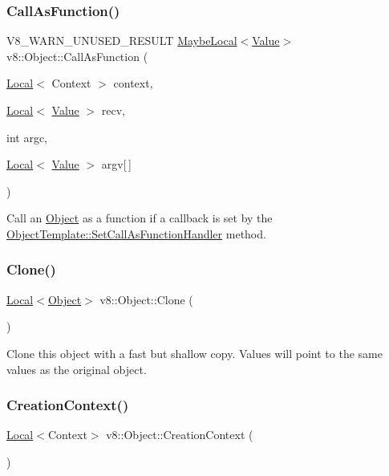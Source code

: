 \subsubsection{\texorpdfstring{Call\+As\+Function()}{CallAsFunction()}}
{\footnotesize\ttfamily V8\+\_\+\+W\+A\+R\+N\+\_\+\+U\+N\+U\+S\+E\+D\+\_\+\+R\+E\+S\+U\+LT \mbox{\hyperlink{classv8_1_1MaybeLocal}{Maybe\+Local}}$<$\mbox{\hyperlink{classv8_1_1Value}{Value}}$>$ v8\+::\+Object\+::\+Call\+As\+Function (\begin{DoxyParamCaption}\item[{\mbox{\hyperlink{classv8_1_1Local}{Local}}$<$ Context $>$}]{context,  }\item[{\mbox{\hyperlink{classv8_1_1Local}{Local}}$<$ \mbox{\hyperlink{classv8_1_1Value}{Value}} $>$}]{recv,  }\item[{int}]{argc,  }\item[{\mbox{\hyperlink{classv8_1_1Local}{Local}}$<$ \mbox{\hyperlink{classv8_1_1Value}{Value}} $>$}]{argv\mbox{[}$\,$\mbox{]} }\end{DoxyParamCaption})}

Call an \mbox{\hyperlink{classv8_1_1Object}{Object}} as a function if a callback is set by the \mbox{\hyperlink{classv8_1_1ObjectTemplate_a1775c8f73e643c339804d2f5b628eddf}{Object\+Template\+::\+Set\+Call\+As\+Function\+Handler}} method. \mbox{\label{classv8_1_1Object_a5018c9d085aa71f65530cf1e073a04ad}} 
\subsubsection{\texorpdfstring{Clone()}{Clone()}}
{\footnotesize\ttfamily \mbox{\hyperlink{classv8_1_1Local}{Local}}$<$\mbox{\hyperlink{classv8_1_1Object}{Object}}$>$ v8\+::\+Object\+::\+Clone (\begin{DoxyParamCaption}{ }\end{DoxyParamCaption})}

Clone this object with a fast but shallow copy. Values will point to the same values as the original object. \mbox{\label{classv8_1_1Object_af6966283a7d7e20779961eed434db04d}} 
\subsubsection{\texorpdfstring{Creation\+Context()}{CreationContext()}\hspace{0.1cm}{\footnotesize\ttfamily [1/2]}}
{\footnotesize\ttfamily \mbox{\hyperlink{classv8_1_1Local}{Local}}$<$Context$>$ v8\+::\+Object\+::\+Creation\+Context (\begin{DoxyParamCaption}{ }\end{DoxyParamCaption})}

